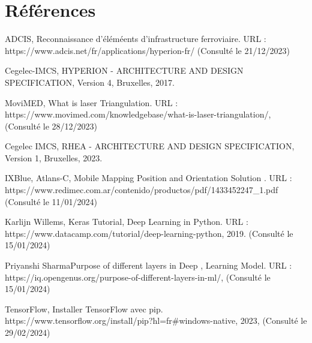 \section{Références}
\printglossary[title=Glossaire]
\renewcommand\refname{Bibliographie}
\begin{thebibliography}{9}

ADCIS, Reconnaissance d'éléméents d'infrastructure ferroviaire. URL : https://www.adcis.net/fr/applications/hyperion-fr/ (Consulté le 21/12/2023)

Cegelec-IMCS, HYPERION - ARCHITECTURE AND DESIGN SPECIFICATION, Version 4, Bruxelles, 2017. 

MoviMED, What is laser Triangulation. URL : https://www.movimed.com/knowledgebase/what-is-laser-triangulation/, (Consulté le 28/12/2023)

Cegelec IMCS, RHEA - ARCHITECTURE AND DESIGN SPECIFICATION, Version 1, Bruxelles, 2023. 


IXBlue, Atlans-C, Mobile Mapping Position and Orientation Solution . URL : https://www.redimec.com.ar/contenido/productos/pdf/1433452247\_1.pdf (Consulté le 11/01/2024)

Karlijn Willems, Keras Tutorial, Deep Learning in Python. URL : https://www.datacamp.com/tutorial/deep-learning-python, 2019. (Consulté le 15/01/2024)

Priyanshi SharmaPurpose of different layers in Deep , Learning Model. URL : https://iq.opengenus.org/purpose-of-different-layers-in-ml/, (Consulté le 15/01/2024)

TensorFlow, Installer TensorFlow avec pip.  https://www.tensorflow.org/install/pip?hl=fr#windows-native, 2023, (Consulté le 29/02/2024)

\end{thebibliography}
